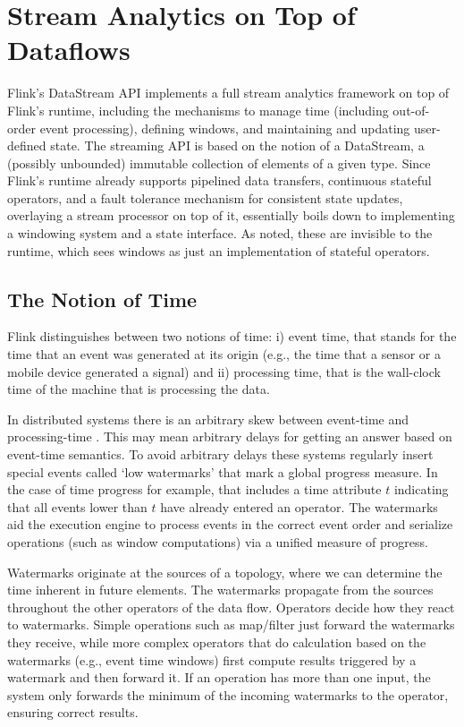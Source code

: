 \section{Stream Analytics on Top of Dataflows}
\label{sec:streaming}

Flink’s DataStream API implements a full stream analytics framework on top of Flink’s runtime, including the mechanisms to manage time (including out-of-order event processing), defining windows, and maintaining and updating user-defined state. The streaming API is based on the notion of a DataStream, a (possibly unbounded) immutable collection of elements of a given type. Since Flink’s runtime already supports pipelined data transfers, continuous stateful operators, and a fault tolerance mechanism for consistent state updates, overlaying a stream processor on top of it, essentially boils down to implementing a windowing system and a state interface. As noted, these are invisible to the runtime, which sees windows as just an implementation of stateful operators. 

\subsection{The Notion of Time}
\label{sec:streaming-time}
Flink distinguishes between two notions of time: i) event time, that  stands for the time that an event was generated at its origin (e.g., the time that a sensor or a mobile device generated a signal) and ii) processing time, that is the wall-clock time of the machine that is processing the data.

In distributed systems there is an arbitrary skew between event-time and processing-time \cite{akidau2015dataflow}. This may mean arbitrary delays for getting an answer based on event-time semantics. To avoid arbitrary delays these systems regularly insert special events called ‘low watermarks’ that mark a global progress measure. In the case of time progress for example, that includes a time attribute $t$ indicating that all events lower than $t$ have already entered an operator. The watermarks aid the execution engine to process events in the correct event order and serialize operations (such as window computations) via a unified measure of progress.

Watermarks originate at the sources of a topology, where we can determine the time inherent in future elements. The watermarks propagate from the sources throughout the other operators of the data flow. Operators decide how they react to watermarks. Simple operations such as map/filter just forward the watermarks they receive, while more complex operators that do calculation based on the watermarks (e.g., event time windows) first compute results triggered by a watermark and then forward it. If an operation has more than one input, the system only forwards the minimum of the incoming watermarks to the operator, ensuring correct results.

